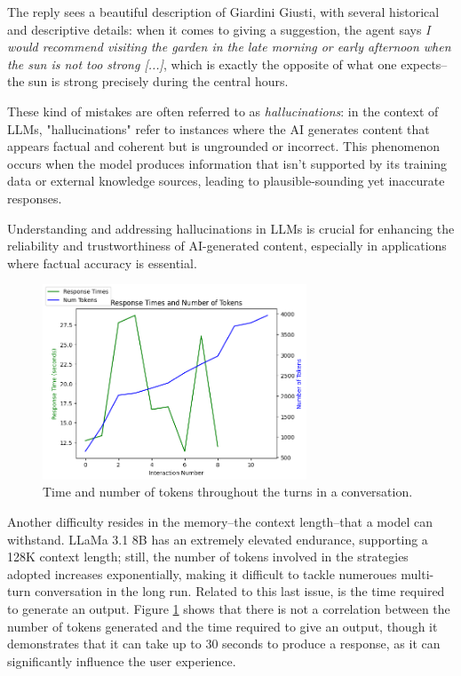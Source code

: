The reply sees a beautiful description of Giardini Giusti, with several historical and descriptive details: when it comes to giving a suggestion, the agent says \textit{I would recommend visiting the garden in the late morning or early afternoon when the sun is not too strong [...]}, which is exactly the opposite of what one expects--the sun is strong precisely during the central hours.

These kind of mistakes are often referred to as \textit{hallucinations}: in the context of LLMs, "hallucinations" refer to instances where the AI generates content that appears factual and coherent but is ungrounded or incorrect. This phenomenon occurs when the model produces information that isn't supported by its training data or external knowledge sources, leading to plausible-sounding yet inaccurate responses. \cite{hallucinations2023}

Understanding and addressing hallucinations in LLMs is crucial for enhancing the reliability and trustworthiness of AI-generated content, especially in applications where factual accuracy is essential.

\begin{figure}[htpb]
    \centering
    \includegraphics[width=0.7\textwidth]{images/resp-time-num-tokens.png}
    \caption{Time and number of tokens throughout the turns in a conversation.}
    \label{fig:time-tokens}
\end{figure}

Another difficulty resides in the memory--the context length--that a model can withstand. LLaMa 3.1 8B has an extremely elevated endurance, supporting a 128K context length; still, the number of tokens involved in the strategies adopted increases exponentially, making it difficult to tackle numeroues multi-turn conversation in the long run. Related to this last issue, is the time required to generate an output. Figure \ref{fig:time-tokens} shows that there is not a correlation between the number of tokens generated and the time required to give an output, though it demonstrates that it can take up to 30 seconds to produce a response, as it can significantly influence the user experience.

